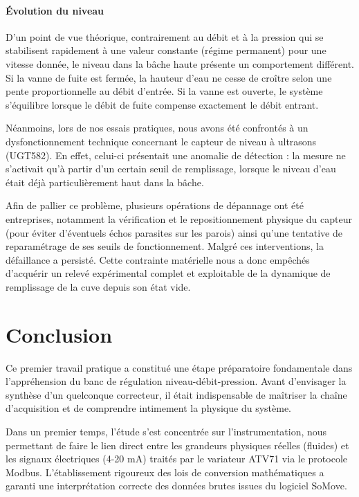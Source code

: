 \documentclass[12pt,a4paper]{article}
\begin{document}
\subsection{Évolution du niveau}

D'un point de vue théorique, contrairement au débit et à la pression qui se stabilisent rapidement à une valeur constante (régime permanent) pour une vitesse donnée, le niveau dans la bâche haute présente un comportement différent. Si la vanne de fuite est fermée, la hauteur d'eau ne cesse de croître selon une pente proportionnelle au débit d'entrée. Si la vanne est ouverte, le système s'équilibre lorsque le débit de fuite compense exactement le débit entrant.

Néanmoins, lors de nos essais pratiques, nous avons été confrontés à un dysfonctionnement technique concernant le capteur de niveau à ultrasons (UGT582). En effet, celui-ci présentait une anomalie de détection : la mesure ne s'activait qu'à partir d'un certain seuil de remplissage, lorsque le niveau d'eau était déjà particulièrement haut dans la bâche. 

Afin de pallier ce problème, plusieurs opérations de dépannage ont été entreprises, notamment la vérification et le repositionnement physique du capteur (pour éviter d'éventuels échos parasites sur les parois) ainsi qu'une tentative de reparamétrage de ses seuils de fonctionnement. Malgré ces interventions, la défaillance a persisté. Cette contrainte matérielle nous a donc empêchés d'acquérir un relevé expérimental complet et exploitable de la dynamique de remplissage de la cuve depuis son état vide.


\clearpage

\part{Conclusion}

Ce premier travail pratique a constitué une étape préparatoire fondamentale dans l'appréhension du banc de régulation niveau-débit-pression. Avant d'envisager la synthèse d'un quelconque correcteur, il était indispensable de maîtriser la chaîne d'acquisition et de comprendre intimement la physique du système.

Dans un premier temps, l'étude s'est concentrée sur l'instrumentation, nous permettant de faire le lien direct entre les grandeurs physiques réelles (fluides) et les signaux électriques (4-20 mA) traités par le variateur ATV71 via le protocole Modbus. L'établissement rigoureux des lois de conversion mathématiques a garanti une interprétation correcte des données brutes issues du logiciel SoMove.
\end{document}
